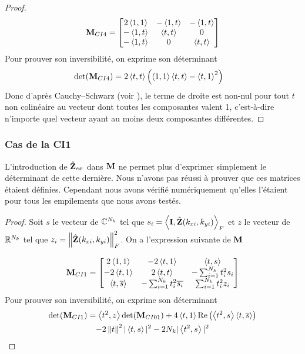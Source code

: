       \begin{proof}
        \begin{equation*}
          {\mathbf{M}}_{CI4} = \begin{bmatrix}
          2\left<{1},{1}\right> & -\left<{1},{t}\right> & -\left<{1},{t}\right>
          \\
          -\left<{1},{t}\right> & \left<{t},{t}\right>  & 0
          \\
          -\left<{1},{t}\right> & 0          & \left<{t},{t}\right>
          \end{bmatrix}
        \end{equation*}
        Pour prouver son inversibilité, on exprime son déterminant 
        \begin{align*}
          \det({\mathbf{M}}_{CI4}) &= 2\left<{t},{t}\right>\left( \left<{1},{1}\right>\left<{t},{t}\right> - \left<{t},{1}\right>^2\right)
        \end{align*}
        Donc d'après Cauchy–Schwarz (voir \cite[\href{https://dlmf.nist.gov/1.7\#E1}{eq.~1.7.1}]{dlmf_nist_2019}), le terme de droite est non-nul pour tout \(t\) non colinéaire au vecteur dont toutes les composantes valent 1, c'est-à-dire n'importe quel vecteur ayant au moins deux composantes différentes.
      \end{proof}

      \subsubsection{Cas de la CI1}

      L'introduction de \(\hat{\mathbf{Z}}_{ex}\) dans \(\mathbf{M}\) ne permet plus d'exprimer simplement le déterminant de cette dernière. Nous n'avons pas réussi à prouver que ces matrices étaient définies. Cependant nous avons vérifié numériquement qu'elles l'étaient pour tous les empilements que nous avons testés.

      \begin{proof}
        Soit \(s\) le vecteur de \(\mathbb C^{N_{k}}\) tel que \(s_i = \left<{\mathbf{I}},{\hat{\mathbf{Z}}(k_{xi},k_{yi})}\right>_F\) et \(z\) le vecteur de \(\mathbb R^{N_{k}}\) tel que \(z_i = \left\lVert\hat{\mathbf{Z}}(k_{xi},k_{yi})\right\rVert_F^2\). On a l'expression suivante de \({\mathbf{M}}\)

        \begin{equation*}
          {\mathbf{M}}_{CI1} = \begin{bmatrix}
          2\left<{1},{1}\right>  & -2\left<{t},{1}\right> & \left<{t},{s}\right>
          \\
          -2\left<{t},{1}\right> & 2\left<{t},{t}\right> & -\sum_{i=1}^{N_{k}} t_i^2 s_i
          \\
          \left<{t},{{\overline{s}}}\right> & -\sum_{i=1}^{N_{k}} t_i^2 {\overline{s_i}} & \sum_{i=1}^{N_{k}} t_i^2 z_i
          \end{bmatrix}
        \end{equation*}
        Pour prouver son inversibilité, on exprime son déterminant 
        \begin{multline*}
          \det( {\mathbf{M}}_{CI1}) = \left<{t^2},{z}\right>\det({\mathbf{M}}_{CI01}) + 4 \left<{t},{1}\right>\operatorname{Re}\left(\left<{t^2},{s}\right>\left<{t},{{\overline{s}}}\right>\right)
          \\
          - 2\left\lVert t\right\rVert^2|\left<{t},{s}\right>|^2 - 2 N_k|\left<{t^2},{s}\right>|^2
        \end{multline*}
      \end{proof}


